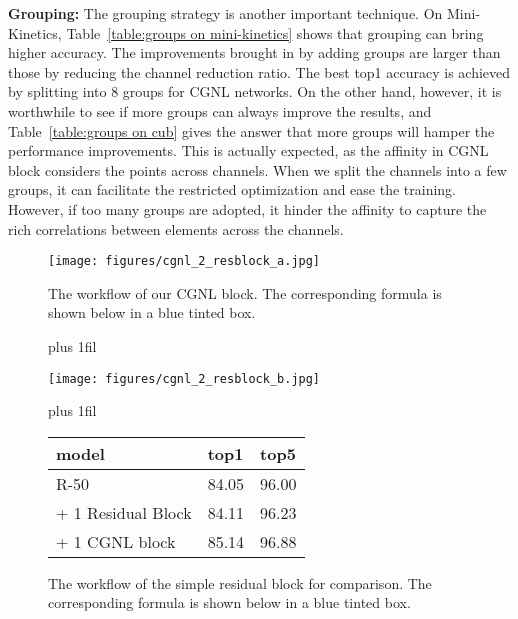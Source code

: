 \documentclass{article}
\begin{document}
\textbf{Grouping:}
The grouping strategy is another important technique.
On Mini-Kinetics, Table~\ref{table:groups on mini-kinetics} shows that grouping can bring higher accuracy.
The improvements brought in by adding groups are larger than those by reducing the channel reduction ratio.
The best top1 accuracy is achieved by splitting into 8 groups for CGNL networks.
On the other hand, however, it is worthwhile to see if more groups can always improve the results, and Table~\ref{table:groups on cub} gives the answer that more groups will hamper the performance improvements.
This is actually expected, as the affinity in CGNL block considers the points across channels. When we split the channels into a few groups, it can facilitate the restricted optimization and ease the training.
However, if too many groups are adopted, it hinder the affinity to capture the rich correlations between elements across the channels.
% 
%
\begin{figure}[ht]
  \begin{minipage}[]{0.32\textwidth}
    \centering
    \texttt{[image: figures/cgnl\_2\_resblock\_a.jpg]}
    \caption{\small{
      The workflow of our CGNL block.
      The corresponding formula is shown below in a blue tinted box.
    }}
    \label{fig:cgnl_2_resblock_a}
  \end{minipage}
  \hskip 3pt plus 1fil
  \begin{minipage}[]{0.32\textwidth}
    \centering
    \texttt{[image: figures/cgnl\_2\_resblock\_b.jpg]}
    \caption{\small{
      The workflow of the simple residual block for comparison.
      The corresponding formula is shown below in a blue tinted box.
    }}
    \label{fig:cgnl_2_resblock_b}
  \end{minipage}
  \hskip 3pt plus 1fil
  \begin{minipage}[h]{0.3\textwidth}
    \centering
    \scriptsize
    \begin{tabular}[t]{lll}
    \toprule
    model                     & top1    & top5    \\
    \midrule
    R-50                      & 84.05   & 96.00   \\
    \cmidrule(r){2-3}
    + 1 Residual Block        & 84.11   & 96.23   \\
    + 1 CGNL block            & 85.14   & 96.88   \\
    \bottomrule
    \end{tabular}
    \label{table:cgnl_2_resblock}
  \end{minipage}
\end{figure}
% 
% 
\end{document}
